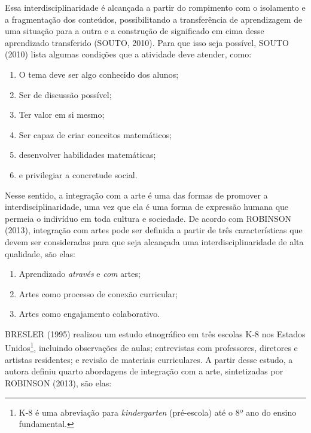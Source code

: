 \documentclass[
  letterpaper,
  DIV=11,
  numbers=noendperiod]{scrreprt}
\providecommand{\tightlist}{%
  \setlength{\itemsep}{0pt}\setlength{\parskip}{0pt}}\usepackage{longtable,booktabs,array}
\begin{document}
Essa interdisciplinaridade é alcançada a partir do rompimento com o
isolamento e a fragmentação dos conteúdos, possibilitando a
transferência de aprendizagem de uma situação para a outra e a
construção de significado em cima desse aprendizado transferido (SOUTO,
2010). Para que isso seja possível, SOUTO (2010) lista algumas condições
que a atividade deve atender, como:

\begin{enumerate}
\def\labelenumi{\arabic{enumi}.}
\tightlist
\item
  O tema deve ser algo conhecido dos alunos;
\item
  Ser de discussão possível;
\item
  Ter valor em si mesmo;
\item
  Ser capaz de criar conceitos matemáticos;
\item
  desenvolver habilidades matemáticas;
\item
  e privilegiar a concretude social.
\end{enumerate}

Nesse sentido, a integração com a arte é uma das formas de promover a
interdisciplinaridade, uma vez que ela é uma forma de expressão humana
que permeia o indivíduo em toda cultura e sociedade. De acordo com
ROBINSON (2013), integração com artes pode ser definida a partir de três
características que devem ser consideradas para que seja alcançada uma
interdisciplinaridade de alta qualidade, são elas:

\begin{enumerate}
\def\labelenumi{\arabic{enumi}.}
\tightlist
\item
  Aprendizado \emph{através} e \emph{com} artes;
\item
  Artes como processo de conexão curricular;
\item
  Artes como engajamento colaborativo.
\end{enumerate}

BRESLER (1995) realizou um estudo etnográfico em três escolas K-8 nos
Estados Unidos\footnote{K-8 é uma abreviação para \emph{kindergarten}
  (pré-escola) até o 8º ano do ensino fundamental.}, incluindo
observações de aulas; entrevistas com professores, diretores e artistas
residentes; e revisão de materiais curriculares. A partir desse estudo,
a autora definiu quarto abordagens de integração com a arte,
sintetizadas por ROBINSON (2013), são elas:
\end{document}

